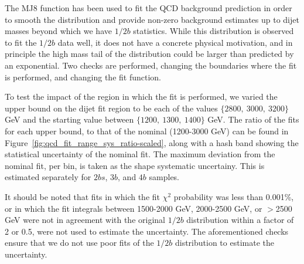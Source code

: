 The MJ8 function has been used to fit the QCD background prediction in order to smooth the distribution and provide non-zero background estimates up to dijet masses beyond which we have $1/2b$ statistics.  While this distribution is  observed to fit the $1/2b$ data well, it does not have a concrete physical motivation, and in principle the high mass tail of the distribution could be larger than predicted by an exponential.  Two checks are performed, changing the boundaries where the fit is performed, and changing the fit function.

To test the impact of the region in which the fit is performed, we varied the upper bound on the dijet fit region to be each of the values $\{2800,\ 3000,\ 3200\}$ GeV and the starting value between $\{1200,\ 1300,\ 1400\}$ GeV.  The ratio of the fits for each upper bound, to that of the nominal (1200-3000 GeV) can be found in Figure~\ref{fig:qcd_fit_range_sys_ratio-scaled}, along with a hash band showing the statistical uncertainty of the nominal fit.  The maximum deviation from the nominal fit, per bin, is taken as the shape systematic uncertainy.  This is estimated separately for $2bs$, $3b$, and $4b$ samples.

It should be noted that fits in which the fit $\chi^2$ probability was less than 0.001\%, or in which the fit integrals between 1500-2000 GeV, 2000-2500 GeV, or $>$2500 GeV were not in agreement with the original $1/2b$ distribution within a factor of 2 or 0.5, were not used to estimate the uncertainty.  The aforementioned checks ensure that we do not use poor fits of the $1/2b$ distribution to estimate the uncertainty.



